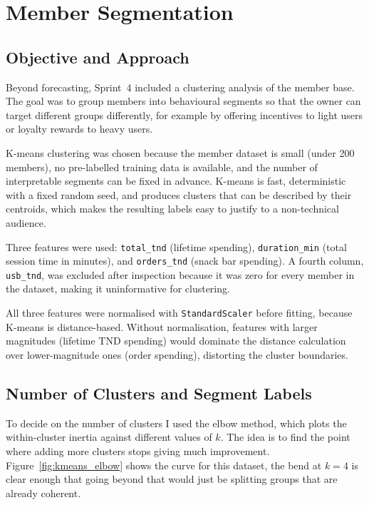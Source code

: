 \documentclass[12pt, a4paper]{report}
\begin{document}
\section{Member Segmentation}

\subsection{Objective and Approach}

Beyond forecasting, Sprint~4 included a clustering analysis of the member base.
The goal was to group members into behavioural segments so that the owner can
target different groups differently, for example by offering incentives to light
users or loyalty rewards to heavy users.

K-means clustering was chosen because the member dataset is small (under 200
members), no pre-labelled training data is available, and the number of
interpretable segments can be fixed in advance. K-means is fast, deterministic
with a fixed random seed, and produces clusters that can be described by their
centroids, which makes the resulting labels easy to justify to a non-technical
audience.

Three features were used: \texttt{total\_tnd} (lifetime spending),
\texttt{duration\_min} (total session time in minutes), and \texttt{orders\_tnd}
(snack bar spending). A fourth column, \texttt{usb\_tnd}, was excluded after
inspection because it was zero for every member in the dataset, making it
uninformative for clustering.

All three features were normalised with \texttt{StandardScaler} before fitting,
because K-means is distance-based. Without normalisation, features with larger
magnitudes (lifetime TND spending) would dominate the distance calculation over
lower-magnitude ones (order spending), distorting the cluster boundaries.

\subsection{Number of Clusters and Segment Labels}

To decide on the number of clusters I used the elbow method, which plots the
within-cluster inertia against different values of $k$. The idea is to find the
point where adding more clusters stops giving much improvement.
Figure~\ref{fig:kmeans_elbow} shows the curve for this dataset, the bend at
$k = 4$ is clear enough that going beyond that would just be splitting groups
that are already coherent.
\end{document}
